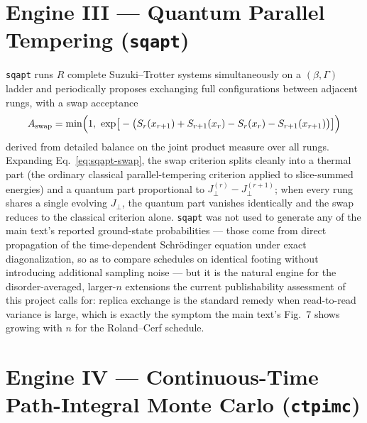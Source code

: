\documentclass[11pt]{article}
\begin{document}
\section{Engine III --- Quantum Parallel Tempering (\texttt{sqapt})}
\label{sec:sqapt}

\texttt{sqapt} runs $R$ complete Suzuki--Trotter systems simultaneously on a $(\beta,\Gamma)$
ladder and periodically proposes exchanging full configurations between adjacent rungs, with a
swap acceptance
\begin{equation}
A_{\rm swap} = \min\!\Big(1,\ \exp\!\big[-\big(S_r(x_{r+1})+S_{r+1}(x_r)-S_r(x_r)-S_{r+1}(x_{r+1})\big)\big]\Big)
\label{eq:sqapt-swap}
\end{equation}
derived from detailed balance on the joint product measure over all rungs. Expanding
Eq.~\eqref{eq:sqapt-swap}, the swap criterion splits cleanly into a thermal part (the ordinary
classical parallel-tempering criterion applied to slice-summed energies) and a quantum part
proportional to $J_\perp^{(r)}-J_\perp^{(r+1)}$; when every rung shares a single evolving
$J_\perp$, the quantum part vanishes identically and the swap reduces to the classical criterion
alone. \texttt{sqapt} was not used to
generate any of the main text's reported ground-state probabilities --- those come from direct
propagation of the time-dependent Schr\"odinger equation under exact diagonalization, so as to
compare schedules on identical footing without introducing additional sampling noise --- but it
is the natural engine for the disorder-averaged, larger-$n$ extensions the current publishability
assessment of this project calls for: replica exchange is the standard remedy when read-to-read
variance is large, which is exactly the symptom the main text's Fig.~7 shows growing with $n$ for
the Roland--Cerf schedule.

\section{Engine IV --- Continuous-Time Path-Integral Monte Carlo (\texttt{ctpimc})}
\label{sec:ctpimc}
\end{document}
